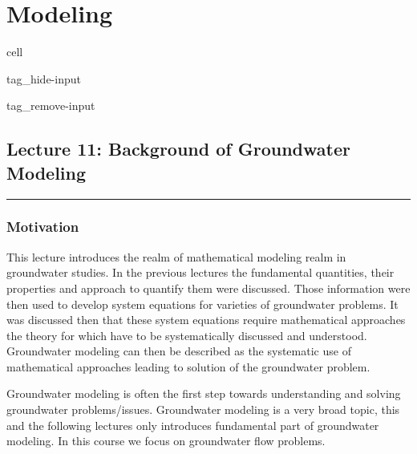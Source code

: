 \documentclass[letterpaper,10pt,english]{jupyterBook}
\begin{document}
\part{Modeling}

\sphinxstepscope

\begin{sphinxuseclass}{cell}
\begin{sphinxuseclass}{tag_hide-input}
\begin{sphinxuseclass}{tag_remove-input}
\end{sphinxuseclass}
\end{sphinxuseclass}
\end{sphinxuseclass}

\chapter{Lecture 11:  Background of Groundwater Modeling}
\label{\detokenize{content/modeling/31_intro_modeling:lecture-11-background-of-groundwater-modeling}}\label{\detokenize{content/modeling/31_intro_modeling::doc}}
\sphinxAtStartPar
{}


\bigskip\hrule\bigskip



\section{Motivation}
\label{\detokenize{content/modeling/31_intro_modeling:motivation}}
\sphinxAtStartPar
This lecture introduces the realm of mathematical modeling realm in groundwater studies. In the previous lectures the fundamental quantities, their properties and approach to quantify them were discussed. Those information were then used to develop system equations for varieties of groundwater problems. It was discussed then that these system equations require mathematical approaches the theory for which have to be systematically discussed and understood. Groundwater modeling can then be described as the systematic use of mathematical approaches leading to solution of the groundwater problem.

\sphinxAtStartPar
Groundwater modeling is often the first step towards understanding and solving groundwater problems/issues. Groundwater modeling is a very broad topic, this and the following lectures only introduces fundamental part of groundwater modeling. In this course we focus on groundwater flow problems.
\end{document}
